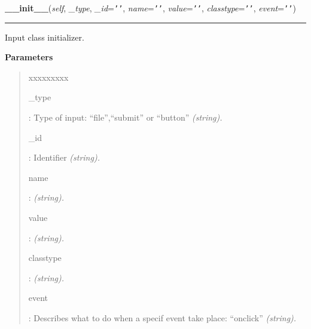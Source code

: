     \label{module_Web:Input:__init__}

    \vspace{0.5ex}

\hspace{.8\funcindent}\begin{boxedminipage}{\funcwidth}

    \raggedright \textbf{\_\_init\_\_}(\textit{self}, \textit{\_type}, \textit{\_id}={\tt \texttt{'}\texttt{}\texttt{'}}, \textit{name}={\tt \texttt{'}\texttt{}\texttt{'}}, \textit{value}={\tt \texttt{'}\texttt{}\texttt{'}}, \textit{classtype}={\tt \texttt{'}\texttt{}\texttt{'}}, \textit{event}={\tt \texttt{'}\texttt{}\texttt{'}})

    \vspace{-1.5ex}

    \rule{\textwidth}{0.5\fboxrule}
\setlength{\parskip}{2ex}

Input class initializer.
%
\begin{quote}

\end{quote}
\setlength{\parskip}{1ex}
      \textbf{Parameters}
      \vspace{-1ex}

      \begin{quote}
        \begin{Ventry}{xxxxxxxxx}

          \item[\_type]


:              Type of input: ``file'',``submit'' or ``button'' \emph{(string).}
          \item[\_id]


:                Identifier \emph{(string).}
          \item[name]


:               \emph{(string).}
          \item[value]


:              \emph{(string).}
          \item[classtype]


:  \emph{(string).}
          \item[event]


:              Describes what to do when a specif event take place: ``onclick'' \emph{(string).}
        \end{Ventry}


\end{quote}
\end{boxedminipage}
